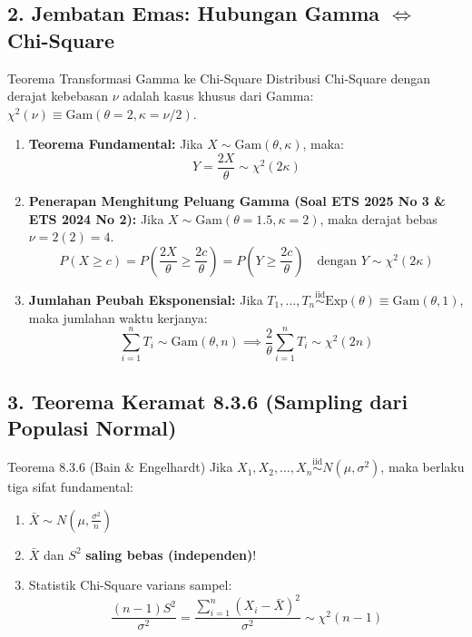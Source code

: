 \documentclass[10pt,twoside]{article}
\begin{document}
\subsection{2. Jembatan Emas: Hubungan Gamma $\iff$ Chi-Square}
\begin{teoribox}{Teorema Transformasi Gamma ke Chi-Square}
Distribusi Chi-Square dengan derajat kebebasan $\nu$ adalah kasus khusus dari Gamma: $\chi^2(\nu) \equiv \text{Gam}(\theta = 2, \kappa = \nu/2)$.
\begin{enumerate}
  \item \textbf{Teorema Fundamental:} Jika $X \sim \text{Gam}(\theta, \kappa)$, maka:
    \begin{equation*}
      Y = \frac{2X}{\theta} \sim \chi^2(2\kappa)
    \end{equation*}
  \item \textbf{Penerapan Menghitung Peluang Gamma (Soal ETS 2025 No 3 \& ETS 2024 No 2):}
    Jika $X \sim \text{Gam}(\theta = 1.5, \kappa = 2)$, maka derajat bebas $\nu = 2(2) = 4$.
    \begin{equation*}
      P(X \ge c) = P\left(\frac{2X}{\theta} \ge \frac{2c}{\theta}\right) = P\left(Y \ge \frac{2c}{\theta}\right) \quad \text{dengan } Y \sim \chi^2(2\kappa)
    \end{equation*}
  \item \textbf{Jumlahan Peubah Eksponensial:}
    Jika $T_1, \dots, T_n \stackrel{\text{iid}}{\sim} \text{Exp}(\theta) \equiv \text{Gam}(\theta, 1)$, maka jumlahan waktu kerjanya:
    \begin{equation*}
      \sum_{i=1}^n T_i \sim \text{Gam}(\theta, n) \implies \frac{2}{\theta}\sum_{i=1}^n T_i \sim \chi^2(2n)
    \end{equation*}
\end{enumerate}
\end{teoribox}

\subsection{3. Teorema Keramat 8.3.6 (Sampling dari Populasi Normal)}
\begin{teoribox}{Teorema 8.3.6 (Bain \& Engelhardt)}
Jika $X_1, X_2, \dots, X_n \stackrel{\text{iid}}{\sim} N(\mu, \sigma^2)$, maka berlaku tiga sifat fundamental:
\begin{enumerate}
  \item $\bar{X} \sim N\left(\mu, \frac{\sigma^2}{n}\right)$
  \item $\bar{X}$ dan $S^2$ \textbf{saling bebas (independen)}!
  \item Statistik Chi-Square varians sampel:
    \begin{equation*}
      \frac{(n-1)S^2}{\sigma^2} = \frac{\sum_{i=1}^n (X_i - \bar{X})^2}{\sigma^2} \sim \chi^2(n-1)
    \end{equation*}
\end{enumerate}
\end{teoribox}
\end{document}

